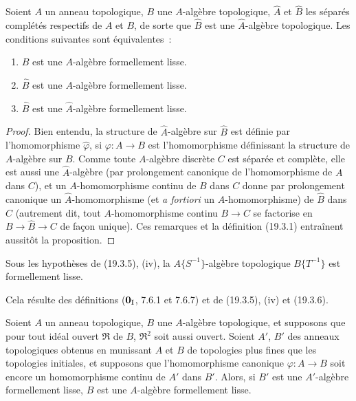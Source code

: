 
\begin{proposition}[19.3.6]
\label{0.19.3.6-fr}
Soient $A$ un anneau topologique, $B$ une $A$-algèbre topologique, $\hat A$
et $\hat B$ les séparés complétés respectifs de $A$ et $B$, de sorte que
$\hat B$ est une $\hat A$-algèbre topologique. Les conditions suivantes
sont équivalentes~:
\begin{enumerate}
  \item[a)] $B$ est une $A$-algèbre formellement lisse.
  \item[b)] $\hat B$ est une $A$-algèbre formellement lisse.
  \item[c)] $\hat B$ est une $\hat A$-algèbre formellement lisse.
\end{enumerate}
\end{proposition}

\begin{proof}
Bien entendu, la structure de $\hat A$-algèbre sur $\hat B$ est définie
par l'homomorphisme $\hat\varphi$, si $\varphi:A\to B$ est
l'homomorphisme définissant la structure de $A$-algèbre sur $B$. Comme toute
$A$-algèbre discrète $C$ est séparée et complète, elle est aussi une
$\hat A$-algèbre (par prolongement canonique de l'homomorphisme de $A$ dans
$C$), et un $A$-homomorphisme continu de $B$ dans $C$ donne par prolongement
canonique un $\hat A$-homomorphisme (et \emph{a fortiori} un
$A$-homomorphisme) de $\hat B$ dans $C$ (autrement dit, tout
$A$-homomorphisme continu $B\to C$ se factorise en $B\to\hat B\to C$ de façon
unique). Ces remarques et la définition (19.3.1) entraînent aussitôt la
proposition.
\end{proof}

\begin{corollary}[19.3.7]
\label{0.19.3.7-fr}
Sous les hypothèses de (19.3.5), (iv), la $A\{S^{-1}\}$-algèbre topologique
$B\{T^{-1}\}$ est formellement lisse.
\end{corollary}

Cela résulte des définitions ($\mathbf 0_{\rm I}$, 7.6.1 et 7.6.7) et de
(19.3.5), (iv) et (19.3.6).

\begin{proposition}[19.3.8]
\label{0.19.3.8-fr}
Soient $A$ un anneau topologique, $B$ une $A$-algèbre topologique, et supposons
que pour tout idéal ouvert $\mathfrak R$ de $B$, $\mathfrak R^2$ soit aussi
ouvert. Soient $A'$, $B'$ des anneaux topologiques obtenus en munissant $A$ et
$B$ de topologies plus fines que les topologies initiales, et supposons que
l'homomorphisme canonique $\varphi:A\to B$ soit encore un homomorphisme
continu de $A'$ dans $B'$. Alors, si $B'$ est une $A'$-algèbre formellement
lisse, $B$ est une $A$-algèbre formellement lisse.
\end{proposition}

